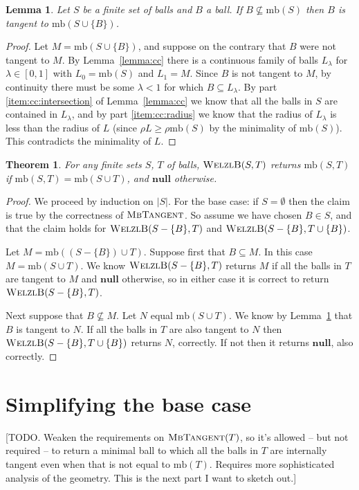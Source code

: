 \documentclass[a4paper]{article}
\newtheorem{lemma}{Lemma}[section]
\newtheorem{theorem}{Theorem}[section]
\newcommand\alg[1]{\mbox{\textsc{#1}}}
\newcommand\undef{\mathbf{null}}
\newcommand\mb{\mathrm{mb}}
\let\radius\rho
\begin{document}
\begin{lemma}\label{lemma:tangent}
  Let $S$ be a finite set of balls and $B$ a ball. If $B\not\subseteq\mb(S)$ then $B$ is tangent to $\mb(S\cup\{B\})$.
\end{lemma}
\begin{proof}
  Let $M = \mb(S\cup\{B\})$, and suppose on the contrary that $B$ were not tangent to $M$.
  By Lemma~\ref{lemma:cc} there is a continuous family of balls $L_\lambda$ for $\lambda\in[0,1]$
  with $L_0=\mb(S)$ and $L_1=M$. Since $B$ is not tangent to $M$, by continuity there must be some $\lambda<1$ for which $B\subseteq L_\lambda$. By part \ref{item:cc:intersection} of Lemma~\ref{lemma:cc} we know that all the balls in $S$ are contained in $L_\lambda$, and by part \ref{item:cc:radius} we know that the radius of $L_\lambda$ is less than the radius of $L$ (since $\radius L\geq \radius\mb(S)$ by the minimality of $\mb(S)$). This contradicts the minimality of $L$.
\end{proof}

\begin{theorem}
  For any finite sets $S$, $T$ of balls, $\alg{WelzlB}(S,T)$ returns $\mb(S,T)$ if $\mb(S,T)=\mb(S\cup T)$, and $\undef$ otherwise.
\end{theorem}
\begin{proof}
  We proceed by induction on $|S|$. For the base case: if $S=\emptyset$ then the claim is true by the correctness of $\alg{MbTangent}$. So assume we have chosen $B\in S$, and that the claim holds for $\alg{WelzlB}(S-\{B\},T)$ and $\alg{WelzlB}(S-\{B\},T\cup\{B\})$.

  Let $M = \mb((S-\{B\})\cup T)$. Suppose first that $B\subseteq M$. In this case $M=\mb(S\cup T)$. We know $\alg{WelzlB}(S-\{B\},T)$ returns $M$ if all the balls in $T$ are tangent to $M$ and $\undef$ otherwise, so in either case it is correct to return $\alg{WelzlB}(S-\{B\},T)$.

  Next suppose that $B\not\subseteq M$. Let $N$ equal $\mb(S\cup T)$. We know by Lemma~\ref{lemma:tangent} that $B$ is tangent to $N$. If all the balls in $T$ are also tangent to $N$ then $\alg{WelzlB}(S-\{B\}, T\cup\{B\})$ returns $N$, correctly. If not then it returns $\undef$, also correctly.
\end{proof}

\section{Simplifying the base case}
[TODO. Weaken the requirements on $\alg{MbTangent}(T)$, so it's allowed -- but not required -- to return a minimal ball to which all the balls in $T$ are internally tangent even when that is not equal to $\mb(T)$. Requires more sophisticated analysis of the geometry. This is the next part I want to sketch out.]
\end{document}

